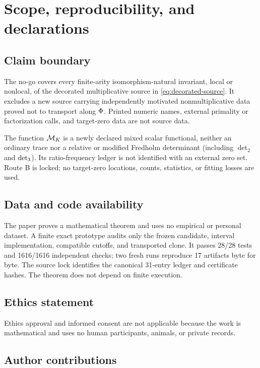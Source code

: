 \section{Scope, reproducibility, and declarations}
\label{app:scope}

\subsection{Claim boundary}

The no-go covers every finite-arity isomorphism-natural invariant, local or
nonlocal, of the decorated multiplicative source in
\eqref{eq:decorated-source}.  It excludes a new source carrying independently
motivated nonmultiplicative data proved not to transport along \(\Phi\).
Printed numeric names, external primality or factorization calls, and
target-zero data are not source data.

The function \(\mathcal M_K\) is a newly declared mixed scalar functional, neither an
ordinary trace nor a relative or modified Fredholm determinant (including
\(\det_2\) and \(\det_{3}\)).  Its ratio-frequency ledger is not identified
with an external zero set.  Route B is locked; no target-zero locations,
counts, statistics, or fitting losses are used.

\subsection{Data and code availability}

The paper proves a mathematical theorem and uses no empirical or personal
dataset.  A finite exact prototype audits only the frozen candidate, interval
implementation, compatible cutoffs, and transported clone.  It passes 28/28
tests and 1616/1616 independent checks; two fresh runs reproduce 17 artifacts
byte for byte.  The source lock identifies the canonical 31-entry ledger and
certificate hashes.  The theorem does not depend on finite execution.

\subsection{Ethics statement}

Ethics approval and informed consent are not applicable because the work is
mathematical and uses no human participants, animals, or private records.

\subsection{Author contributions}

